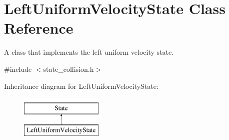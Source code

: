 \hypertarget{classLeftUniformVelocityState}{\section{Left\-Uniform\-Velocity\-State Class Reference}
\label{classLeftUniformVelocityState}
}


A class that implements the left uniform velocity state.  




{\ttfamily \#include $<$state\-\_\-collision.\-h$>$}

Inheritance diagram for Left\-Uniform\-Velocity\-State\-:\begin{figure}[H]
\begin{center}
\leavevmode
\includegraphics[height=2.000000cm]{classLeftUniformVelocityState}
\end{center}
\end{figure}
